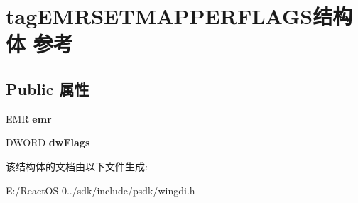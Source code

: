 \hypertarget{structtag_e_m_r_s_e_t_m_a_p_p_e_r_f_l_a_g_s}{}\section{tag\+E\+M\+R\+S\+E\+T\+M\+A\+P\+P\+E\+R\+F\+L\+A\+G\+S结构体 参考}
\label{structtag_e_m_r_s_e_t_m_a_p_p_e_r_f_l_a_g_s}
\subsection*{Public 属性}
\begin{DoxyCompactItemize}
\item 
\mbox{\label{structtag_e_m_r_s_e_t_m_a_p_p_e_r_f_l_a_g_s_a8f32443fd99a9af462ffa6388402aa98}} 
\hyperlink{structtag_e_m_r}{E\+MR} {\bfseries emr}
\item 
\mbox{\label{structtag_e_m_r_s_e_t_m_a_p_p_e_r_f_l_a_g_s_a1cfbade06ff129a0308d42befd34165f}} 
D\+W\+O\+RD {\bfseries dw\+Flags}
\end{DoxyCompactItemize}


该结构体的文档由以下文件生成\+:\begin{DoxyCompactItemize}
\item 
E\+:/\+React\+O\+S-\/0../sdk/include/psdk/wingdi.\+h\end{DoxyCompactItemize}
